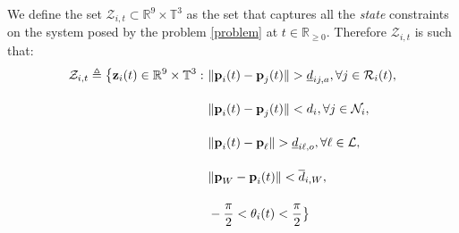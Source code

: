 We define the set $\mathcal{Z}_{i,t} \subset \mathbb{R}^{9} \times \mathbb{T}^3$
as the set that captures all the \textit{state} constraints on the system
posed by the problem \eqref{problem} at $t \in \mathbb{R}_{\geq 0}$.
Therefore $\mathcal{Z}_{i,t}$ is such that:
\begin{align}
  \mathcal{Z}_{i,t} \triangleq \big\{\bm{\mathbf{z}}_i(t) \in \mathbb{R}^{9}\times \mathbb{T}^3 : \
      & \|\bm{\mathbf{p}}_i(t) - \bm{\mathbf{p}}_j(t)\| > \underline{d}_{ij,a}, \forall j \in \mathcal{R}_i(t), \label{constraint:p_1}\\[2.5ex]
      & \|\bm{\mathbf{p}}_i(t) - \bm{\mathbf{p}}_j(t)\| < d_i, \forall j \in \mathcal{N}_i, \\[2.5ex]
      & \|\bm{\mathbf{p}}_i(t) - \bm{\mathbf{p}}_{\ell}\| > \underline{d}_{i\ell,o}, \forall \ell \in \mathcal{L}, \\[2.5ex]
      & \|\bm{\mathbf{p}}_W - \bm{\mathbf{p}}_i(t)\| < \overline{d}_{i,W}, \\[2.5ex]
      & - \frac{\pi}{2} < \theta_i(t) < \frac{\pi}{2} \label{constraint:p_5}\big\}
\end{align}
